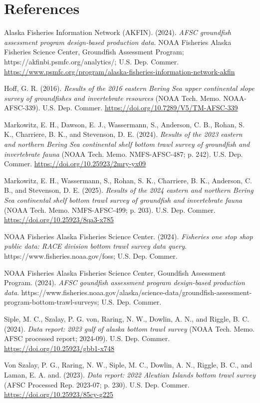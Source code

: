 \documentclass[
  letterpaper,
  oneside,
  open=any]{scrbook}
\newlength{\cslhangindent}
\newenvironment{CSLReferences}[2] %
 {\begin{list}{}{%
  \setlength{\itemindent}{0pt}
  \setlength{\leftmargin}{0pt}
  \setlength{\parsep}{0pt}
  \ifodd #1
   \setlength{\leftmargin}{\cslhangindent}
   \setlength{\itemindent}{-1\cslhangindent}
  \fi
  \setlength{\itemsep}{#2\baselineskip}}}
 {\end{list}}
\begin{document}
\chapter{References}\label{references}

\label{refs}
\begin{CSLReferences}{1}{0}
Alaska Fisheries Information Network (AKFIN). (2024). \emph{AFSC
groundfish assessment program design-based production data}. {NOAA
Fisheries Alaska Fisheries Science Center, Groundfish Assessment
Program}; https://akfinbi.psmfc.org/analytics/; {U.S. Dep. Commer.}
\url{https://www.psmfc.org/program/alaska-fisheries-information-network-akfin}

Hoff, G. R. (2016). \emph{Results of the 2016 eastern {Bering Sea} upper
continental slope survey of groundfishes and invertebrate resources}
(NOAA Tech. Memo. NOAA-AFSC-339). {U.S. Dep. Commer.}
\url{https://doi.org/10.7289/V5/TM-AFSC-339}

Markowitz, E. H., Dawson, E. J., Wassermann, S., Anderson, C. B., Rohan,
S. K., Charriere, B. K., and Stevenson, D. E. (2024). \emph{Results of
the 2023 eastern and northern {Bering Sea} continental shelf bottom
trawl survey of groundfish and invertebrate fauna} (NOAA Tech. Memo.
NMFS-AFSC-487; p. 242). {U.S. Dep. Commer.}
\url{https://doi.org/10.25923/2mry-yx09}

Markowitz, E. H., Wassermann, S., Rohan, S. K., Charriere, B. K.,
Anderson, C. B., and Stevenson, D. E. (2025). \emph{Results of the 2024
eastern and northern {Bering Sea} continental shelf bottom trawl survey
of groundfish and invertebrate fauna} (NOAA Tech. Memo. NMFS-AFSC-499;
p. 203). {U.S. Dep. Commer.} \url{https://doi.org/10.25923/8qa3-x785}

NOAA Fisheries Alaska Fisheries Science Center. (2024). \emph{Fisheries
one stop shop public data: RACE division bottom trawl survey data
query}. https://www.fisheries.noaa.gov/foss; {U.S. Dep. Commer.}

NOAA Fisheries Alaska Fisheries Science Center, Goundfish Assessment
Program. (2024). \emph{AFSC goundfish assessment program design-based
production data}.
https://www.fisheries.noaa.gov/alaska/science-data/groundfish-assessment-program-bottom-trawl-surveys;
{U.S. Dep. Commer.}

Siple, M. C., Szalay, P. G. von, Raring, N. W., Dowlin, A. N., and
Riggle, B. C. (2024). \emph{Data report: 2023 gulf of alaska bottom
trawl survey} (NOAA Tech. Memo. AFSC processed report; 2024-09). {U.S.
Dep. Commer.} \url{https://doi.org/10.25923/gbb1-x748}

Von Szalay, P. G., Raring, N. W., Siple, M. C., Dowlin, A. N., Riggle,
B. C., and Laman, E. A. and. (2023). \emph{Data report: 2022 {Aleutian
Islands} bottom trawl survey} (AFSC Processed Rep. 2023-07; p. 230).
{U.S. Dep. Commer.} \url{https://doi.org/10.25923/85cy-g225}

\end{CSLReferences}


\backmatter
\end{document}
